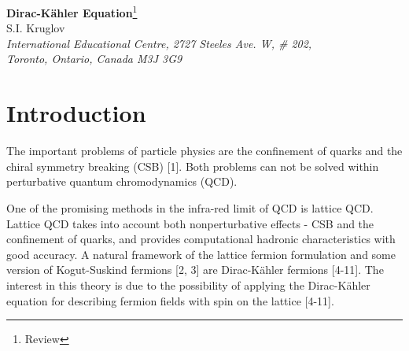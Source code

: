 \documentclass[a4paper,12pt]{article}
\begin{document}
\begin{center}
{\bf Dirac-K\"ahler Equation}\footnote{Review}\\
\vspace{5mm}
 S.I. Kruglov \\
\vspace{5mm}
\textit{International Educational Centre, 2727 Steeles Ave. W, \# 202, \\
Toronto, Ontario, Canada M3J 3G9}
\end{center}

\begin{abstract}
Tensor and matrix formulations of Dirac-K\"ahler equation for massive and
massless fields are considered. The equation matrices obtained are simple
linear combinations of matrix elements in the 16-dimensional space. The
projection matrix-dyads defining all the 16 independent equation solutions
are found. A method of computing the traces of 16-dimensional
Petiau-Duffin-Kemmer matrix product is considered. It is shown that the
symmetry group of the Dirac-K\"ahler tensor fields is \coordHE{}. The
conservation currents corresponding this symmetry are constructed.
Supersymmetry of the Dirac-K\"ahler fields with tensor and spinor parameters
is analyzed. We show the possibility of constructing a gauge model of
interacting Dirac-K\"ahler fields where the gauge group is the noncompact
group under consideration.
\end{abstract}

\section{Introduction}

The important problems of particle physics are the confinement of quarks and
the chiral symmetry breaking (CSB) [1]. Both problems can not be solved
within perturbative quantum chromodynamics (QCD).

One of the promising methods in the infra-red limit of QCD is lattice QCD.
Lattice QCD takes into account both nonperturbative effects - CSB and the
confinement of quarks, and provides computational hadronic characteristics
with good accuracy. A natural framework of the lattice fermion formulation
and some version of Kogut-Suskind fermions [2, 3] are Dirac-K\"ahler
fermions [4-11]. The interest in this theory is due to the possibility of
applying the Dirac-K\"ahler equation for describing fermion fields with spin
\coordHE{} on the lattice [4-11].
\end{document}
